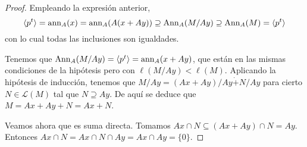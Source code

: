 \begin{proof}
  Empleando la expresión anterior, 
  \[
    \langle p^t\rangle=\operatorname{ann}_A(x)=\operatorname{ann}_A(A(x+Ay))\supseteq
    \operatorname{Ann}_A(M/Ay)\supseteq\operatorname{Ann}_A(M)=\langle p^t\rangle
  \]
  con lo cual todas las inclusiones son igualdades.

  Tenemos que \(\operatorname{Ann}_A(M/Ay)=\langle p^t\rangle=\operatorname{ann}_A(x+Ay)\), que
  están en las mismas condiciones de la hipótesis pero
  con \(\ell(M/Ay)<\ell(M)\). Aplicando la hipótesis de inducción,
  tenemos que \(M/Ay=(Ax+Ay)/Ay \dot{+} N/Ay\) para cierto
  \(N\in\mathcal{L}(M)\) tal que \(N\supseteq Ay\). De aquí se deduce
  que \(M=Ax+Ay+N=Ax+N\).

  Veamos ahora que es suma directa. Tomamos \(Ax\cap N\subseteq(Ax+Ay)\cap N=Ay\).
  Entonces \(Ax\cap N = Ax\cap N\cap Ay= Ax\cap Ay=\{0\}\).
\end{proof}
